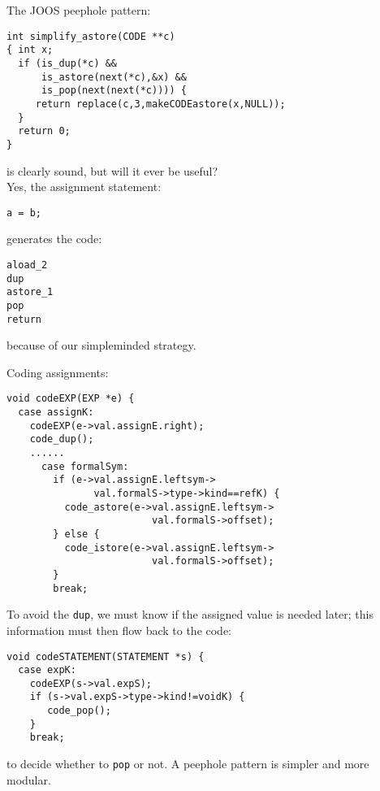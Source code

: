 \begin{slide*}
The JOOS peephole pattern:

\begin{scriptsize}
\begin{verbatim}
int simplify_astore(CODE **c)
{ int x;
  if (is_dup(*c) &&
      is_astore(next(*c),&x) &&
      is_pop(next(next(*c)))) {
     return replace(c,3,makeCODEastore(x,NULL));
  }
  return 0;
}
\end{verbatim}
\end{scriptsize}
is clearly sound, but will it ever be useful?\\

Yes, the assignment statement:

\begin{scriptsize}
\begin{verbatim}
a = b;
\end{verbatim}
\end{scriptsize}

generates the code:

\begin{scriptsize}
\begin{verbatim}
aload_2
dup
astore_1
pop
return
\end{verbatim}
\end{scriptsize}

because of our simpleminded strategy.

\vfil
\end{slide*}
 
\begin{slide*}
Coding assignments:

\begin{scriptsize}
\begin{verbatim}
void codeEXP(EXP *e) {
  case assignK:
    codeEXP(e->val.assignE.right);
    code_dup();
    ......
      case formalSym:
        if (e->val.assignE.leftsym->
               val.formalS->type->kind==refK) {
          code_astore(e->val.assignE.leftsym->
                         val.formalS->offset);
        } else {
          code_istore(e->val.assignE.leftsym->
                         val.formalS->offset);
        }
        break;
\end{verbatim}
\end{scriptsize}

To avoid the {\tt dup}, we must know if the assigned value is needed later;
this information must then flow back to the code:

\begin{scriptsize}
\begin{verbatim}
void codeSTATEMENT(STATEMENT *s) {
  case expK:
    codeEXP(s->val.expS);
    if (s->val.expS->type->kind!=voidK) {
       code_pop();
    }
    break;
\end{verbatim}
\end{scriptsize}

to decide whether to {\tt pop} or not. A peephole pattern is simpler and more modular.

\vfil
\end{slide*}
 
